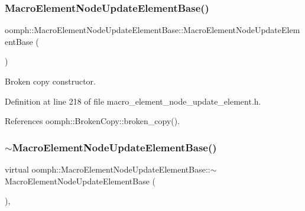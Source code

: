 \subsubsection{\texorpdfstring{Macro\+Element\+Node\+Update\+Element\+Base()}{MacroElementNodeUpdateElementBase()}\hspace{0.1cm}{\footnotesize\ttfamily [2/2]}}
{\footnotesize\ttfamily oomph\+::\+Macro\+Element\+Node\+Update\+Element\+Base\+::\+Macro\+Element\+Node\+Update\+Element\+Base (\begin{DoxyParamCaption}\item[{const \hyperlink{classoomph_1_1MacroElementNodeUpdateElementBase}{Macro\+Element\+Node\+Update\+Element\+Base} \&}]{ }\end{DoxyParamCaption})\hspace{0.3cm}{\ttfamily [inline]}}



Broken copy constructor. 



Definition at line 218 of file macro\+\_\+element\+\_\+node\+\_\+update\+\_\+element.\+h.



References oomph\+::\+Broken\+Copy\+::broken\+\_\+copy().

\mbox{\label{classoomph_1_1MacroElementNodeUpdateElementBase_a2d32df96459ec2729db7a33e3504a4e2}} 
\subsubsection{\texorpdfstring{$\sim$\+Macro\+Element\+Node\+Update\+Element\+Base()}{~MacroElementNodeUpdateElementBase()}}
{\footnotesize\ttfamily virtual oomph\+::\+Macro\+Element\+Node\+Update\+Element\+Base\+::$\sim$\+Macro\+Element\+Node\+Update\+Element\+Base (\begin{DoxyParamCaption}{ }\end{DoxyParamCaption})\hspace{0.3cm}{\ttfamily [inline]}, {\ttfamily [virtual]}}



